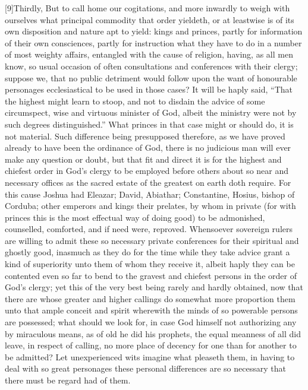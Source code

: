 [9]Thirdly, But to call home our cogitations, and more inwardly to weigh with ourselves what principal commodity that order yieldeth, or at leastwise is of its own disposition and nature apt to yield: kings and princes, partly for information of their own consciences, partly for instruction what they have to do in a number of most weighty affairs, entangled with the cause of religion, having, as all men know, so usual occasion of often consultations and conferences with their clergy; suppose we, that no public detriment would follow upon the want of honourable personages ecclesiastical to be used in those cases? It will be haply said, “That the highest might learn to stoop, and not to disdain the advice of some circumspect, wise and virtuous minister of God, albeit the ministry were not by such degrees distinguished.” What princes in that case might or should do, it is not material. Such difference being presupposed therefore, as we have proved already to have been the ordinance of God, there is no judicious man will ever make any question or doubt, but that fit and direct it is for the highest and chiefest order in God’s clergy to be employed before others about so near and necessary offices as the sacred estate of the greatest on earth doth require. For this cause Joshua had Eleazar; David, Abiathar; Constantine, Hosius, bishop of Corduba; other emperors and kings their prelates, by whom in private (for with princes this is the most effectual way of doing good) to be admonished, counselled, comforted, and if need were, reproved. Whensoever sovereign rulers are willing to admit these so necessary private conferences for their spiritual and ghostly good, inasmuch as they do for the time while they take advice grant a kind of superiority unto them of whom they receive it, albeit haply they can be contented even so far to bend to the gravest and chiefest persons in the order of God’s clergy; yet this of the very best being rarely and hardly obtained, now that there are whose greater and higher callings do somewhat more proportion them unto that ample conceit and spirit wherewith the minds of so powerable persons are possessed; what should we look for, in case God himself not authorizing any by miraculous means, as of old he did his prophets, the  equal meanness of all did leave, in respect of calling, no more place of decency for one than for another to be admitted? Let unexperienced wits imagine what pleaseth them, in having to deal with so great personages these personal differences are so necessary that there must be regard had of them.

